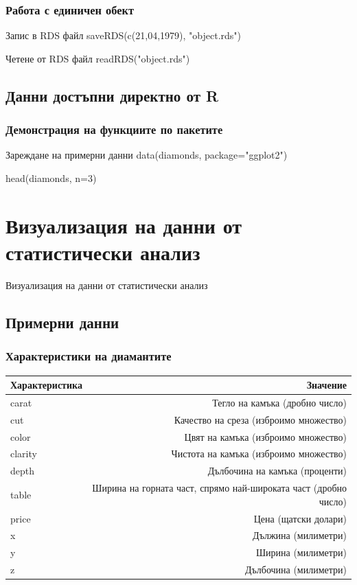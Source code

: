 \documentclass{beamer}
\begin{document}
\begin{frame}
\frametitle{Работа с единичен обект}
\begin{block}{Запис в RDS файл}
saveRDS(c(21,04,1979), "object.rds")
\end{block}

\begin{block}{Четене от RDS файл}
readRDS("object.rds")
\end{block}
\end{frame}

\subsection{Данни достъпни директно от R}

\begin{frame}
\frametitle{Демонстрация на функциите по пакетите}
\begin{block}{Зареждане на примерни данни}
data(diamonds, package="ggplot2")

head(diamonds, n=3)
\end{block}
\end{frame}

\section{Визуализация на данни от статистически анализ}

\begin{frame}
\center \huge{Визуализация на данни от статистически анализ}
\end{frame}

\subsection{Примерни данни}

\begin{frame}
\frametitle{Характеристики на диамантите}
\begin{table}[ht]
\centering
\tiny
\begin{tabular}{|l|r|} 
  \hline
  Характеристика & Значение \\ [0.1ex] 
  \hline\hline
  carat & Тегло на камъка (дробно число) \\
  \hline
  cut & Качество на среза (изброимо множество) \\
  \hline
  color & Цвят на камъка (изброимо множество) \\
  \hline
  clarity & Чистота на камъка (изброимо множество) \\
  \hline
  depth & Дълбочина на камъка (проценти) \\
  \hline
  table & Ширина на горната част, спрямо най-широката част (дробно число) \\
  \hline
  price & Цена (щатски долари) \\
  \hline
  x & Дължина (милиметри) \\
  \hline
  y & Ширина (милиметри) \\
  \hline
  z & Дълбочина (милиметри) \\
  \hline
\end{tabular}
\end{table}
\end{frame}
\end{document}
